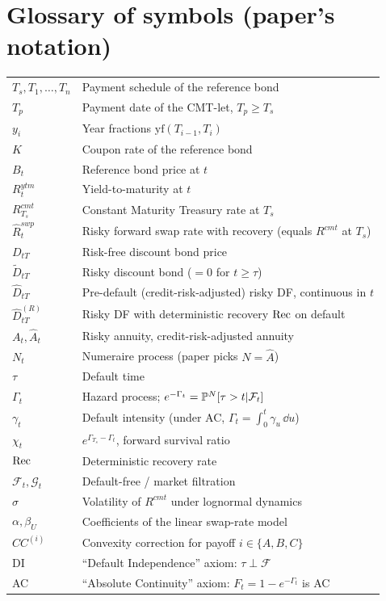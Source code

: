 \documentclass[11pt,a4paper]{article}
\begin{document}
\section{Glossary of symbols (paper's notation)}
\begin{tabular}{@{}p{3cm}p{12cm}@{}}
\toprule
$T_s, T_1, \ldots, T_n$ & Payment schedule of the reference bond \\
$T_p$            & Payment date of the CMT-let, $T_p \ge T_s$ \\
$y_i$            & Year fractions $\mathrm{yf}(T_{i-1}, T_i)$ \\
$K$              & Coupon rate of the reference bond \\
$B_t$            & Reference bond price at $t$ \\
$R^{ytm}_t$      & Yield-to-maturity at $t$ \\
$R^{cmt}_{T_s}$  & Constant Maturity Treasury rate at $T_s$ \\
$\widehat R^{swp}_t$ & Risky forward swap rate with recovery (equals $R^{cmt}$ at $T_s$) \\
$D_{tT}$         & Risk-free discount bond price \\
$\widetilde D_{tT}$ & Risky discount bond ($= 0$ for $t \ge \tau$) \\
$\widehat D_{tT}$ & Pre-default (credit-risk-adjusted) risky DF, continuous in $t$ \\
$\widehat D^{(R)}_{tT}$ & Risky DF with deterministic recovery $\mathrm{Rec}$ on default \\
$A_t, \widehat A_t$ & Risky annuity, credit-risk-adjusted annuity \\
$N_t$            & Numeraire process (paper picks $N = \widehat A$) \\
$\tau$           & Default time \\
$\Gamma_t$       & Hazard process; $e^{-\Gamma_t} = \mathbb{P}^N[\tau > t | \mathcal{F}_{t}]$ \\
$\gamma_t$       & Default intensity (under AC, $\Gamma_t = \int_0^t \gamma_u\,\dd u$) \\
$\chi_t$         & $e^{\Gamma_{T_s} - \Gamma_t}$, forward survival ratio \\
$\mathrm{Rec}$           & Deterministic recovery rate \\
$\mathcal F_t, \mathcal G_t$ & Default-free / market filtration \\
$\sigma$         & Volatility of $R^{cmt}$ under lognormal dynamics \\
$\alpha, \beta_U$ & Coefficients of the linear swap-rate model \\
$CC^{(i)}$       & Convexity correction for payoff $i \in \{A, B, C\}$ \\
DI               & ``Default Independence'' axiom: $\tau \perp \mathcal F$ \\
AC               & ``Absolute Continuity'' axiom: $F_t = 1 - e^{-\Gamma_t}$ is AC \\
\bottomrule
\end{tabular}
\end{document}
